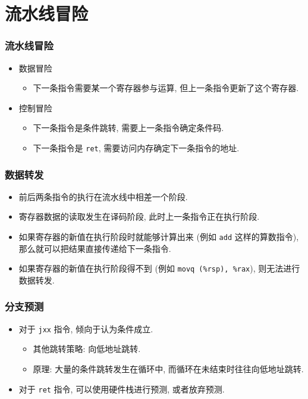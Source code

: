 \documentclass{ctexbeamer}
\newcommand{\ftitle}[1]{\frametitle{\hspace{4ex} {#1}}}
\begin{document}
\section{流水线冒险}
\begin{frame}
    \ftitle{流水线冒险}
    \begin{itemize}
        \item<2- > 数据冒险
            \begin{itemize}
                \item<3- > 下一条指令需要某一个寄存器参与运算, 但上一条指令更新了这个寄存器.
            \end{itemize}
        \item<4- > 控制冒险
            \begin{itemize}
                \item<5- > 下一条指令是条件跳转, 需要上一条指令确定条件码.
                \item<6- > 下一条指令是 \texttt{ret}, 需要访问内存确定下一条指令的地址.
            \end{itemize}
    \end{itemize}
\end{frame}

\begin{frame}
    \ftitle{数据转发}
    \begin{itemize}
        \item<2- > 前后两条指令的执行在流水线中相差一个阶段.
        \item<3- > 寄存器数据的读取发生在译码阶段, 此时上一条指令正在执行阶段.
        \item<4- > 如果寄存器的新值在执行阶段时就能够计算出来
            (例如 \texttt{add} 这样的算数指令),
            那么就可以把结果直接传递给下一条指令.
        \item<5- > 如果寄存器的新值在执行阶段得不到
            (例如 \texttt{movq (\%rsp), \%rax}),
            则无法进行数据转发.
    \end{itemize}
\end{frame}

\begin{frame}
    \ftitle{分支预测}
    \begin{itemize}
        \item<2- > 对于 \texttt{jxx} 指令, 倾向于认为条件成立.
            \begin{itemize}
                \item<3- > 其他跳转策略: 向低地址跳转.
                \item<4- > 原理: 大量的条件跳转发生在循环中, 而循环在未结束时往往向低地址跳转.
            \end{itemize}
        \item<5- > 对于 \texttt{ret} 指令, 可以使用硬件栈进行预测, 或者放弃预测.
    \end{itemize}
\end{frame}
\end{document}
